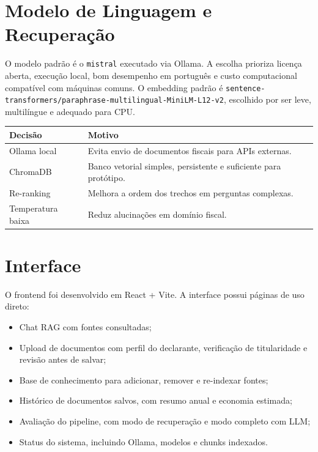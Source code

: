 \documentclass[11pt,a4paper,oneside]{article}
\begin{document}
\section{Modelo de Linguagem e Recuperação}

O modelo padrão é o \texttt{mistral} executado via Ollama. A escolha prioriza licença aberta, execução local, bom desempenho em português e custo computacional compatível com máquinas comuns. O embedding padrão é \texttt{sentence-transformers/paraphrase-multilingual-MiniLM-L12-v2}, escolhido por ser leve, multilíngue e adequado para CPU.

\begin{center}
\begin{tabularx}{\textwidth}{@{}L{36mm}Y@{}}
\toprule
\textbf{Decisão} & \textbf{Motivo} \\
\midrule
Ollama local & Evita envio de documentos fiscais para APIs externas. \\
ChromaDB & Banco vetorial simples, persistente e suficiente para protótipo. \\
Re-ranking & Melhora a ordem dos trechos em perguntas complexas. \\
Temperatura baixa & Reduz alucinações em domínio fiscal. \\
\bottomrule
\end{tabularx}
\end{center}

\section{Interface}

O frontend foi desenvolvido em React + Vite. A interface possui páginas de uso direto:

\begin{itemize}[leftmargin=7mm]
  \item Chat RAG com fontes consultadas;
  \item Upload de documentos com perfil do declarante, verificação de titularidade e revisão antes de salvar;
  \item Base de conhecimento para adicionar, remover e re-indexar fontes;
  \item Histórico de documentos salvos, com resumo anual e economia estimada;
  \item Avaliação do pipeline, com modo de recuperação e modo completo com LLM;
  \item Status do sistema, incluindo Ollama, modelos e chunks indexados.
\end{itemize}
\end{document}
